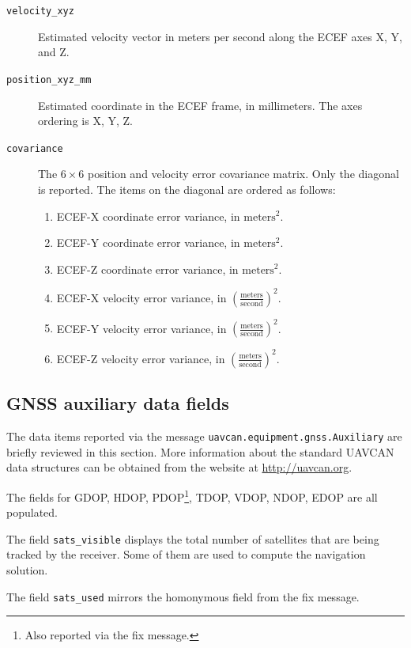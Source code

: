 \documentclass{zubaxdoc}
\begin{document}
\begin{description}
    \item[\texttt{velocity\_xyz}] Estimated velocity vector in meters per second along the ECEF axes X, Y, and Z.
    
    \item[\texttt{position\_xyz\_mm}] Estimated coordinate in the ECEF frame, in millimeters.
    The axes ordering is X, Y, Z.
    
    \item[\texttt{covariance}] The $6\times6$ position and velocity error covariance matrix.
    Only the diagonal is reported. The items on the diagonal are ordered as follows:
    \begin{enumerate}
        \item ECEF-X coordinate error variance, in $\text{meters}^2$.
        \item ECEF-Y coordinate error variance, in $\text{meters}^2$.
        \item ECEF-Z coordinate error variance, in $\text{meters}^2$.
        \item ECEF-X velocity error variance, in $\left(\frac{\text{meters}}{\text{second}}\right)^2$.
        \item ECEF-Y velocity error variance, in $\left(\frac{\text{meters}}{\text{second}}\right)^2$.
        \item ECEF-Z velocity error variance, in $\left(\frac{\text{meters}}{\text{second}}\right)^2$.
    \end{enumerate}
\end{description}

\subsection{GNSS auxiliary data fields}

The data items reported via the message \verb|uavcan.equipment.gnss.Auxiliary| are briefly reviewed
in this section.
More information about the standard UAVCAN data structures can be obtained from the website at
\url{http://uavcan.org}.

The fields for GDOP, HDOP, PDOP\footnote{Also reported via the fix message.}, TDOP, VDOP, NDOP, EDOP
are all populated.

The field \verb|sats_visible| displays the total number of satellites that are being tracked by the receiver.
Some of them are used to compute the navigation solution.

The field \verb|sats_used| mirrors the homonymous field from the fix message.
\end{document}
